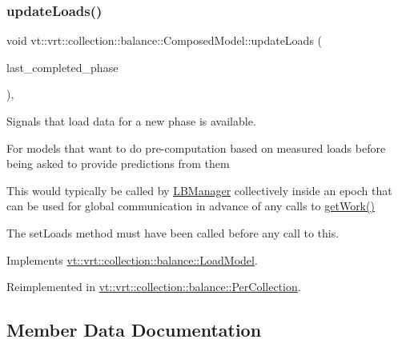 \subsubsection{\texorpdfstring{update\+Loads()}{updateLoads()}}
{\footnotesize\ttfamily void vt\+::vrt\+::collection\+::balance\+::\+Composed\+Model\+::update\+Loads (\begin{DoxyParamCaption}\item[{\hyperlink{namespacevt_a46ce6733d5cdbd735d561b7b4029f6d7}{Phase\+Type}}]{last\+\_\+completed\+\_\+phase }\end{DoxyParamCaption})\hspace{0.3cm}{\ttfamily [override]}, {\ttfamily [virtual]}}



Signals that load data for a new phase is available. 

For models that want to do pre-\/computation based on measured loads before being asked to provide predictions from them

This would typically be called by \hyperlink{structvt_1_1vrt_1_1collection_1_1balance_1_1_l_b_manager}{L\+B\+Manager} collectively inside an epoch that can be used for global communication in advance of any calls to \hyperlink{classvt_1_1vrt_1_1collection_1_1balance_1_1_composed_model_a5de9a43648cfd18ca00f1f0a6c61be4d}{get\+Work()}

The {\ttfamily set\+Loads} method must have been called before any call to this. 

Implements \hyperlink{classvt_1_1vrt_1_1collection_1_1balance_1_1_load_model_a4f1c6fb5d7d7a0b147755f025b1d5f5c}{vt\+::vrt\+::collection\+::balance\+::\+Load\+Model}.



Reimplemented in \hyperlink{structvt_1_1vrt_1_1collection_1_1balance_1_1_per_collection_a2b41fbbe2b684654f8dbfd9207b77501}{vt\+::vrt\+::collection\+::balance\+::\+Per\+Collection}.



\subsection{Member Data Documentation}
\mbox{\label{classvt_1_1vrt_1_1collection_1_1balance_1_1_composed_model_a8a2a6b2d5e79a7c02002132913c9ae55}} 
